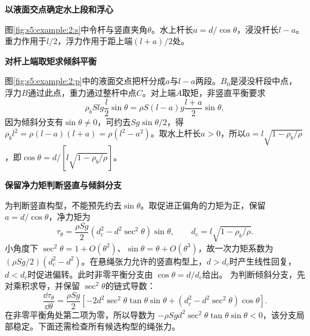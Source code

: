 \begin{solution}\textbf{以液面交点确定水上段和浮心}\par\nobreak
图\ref{fig:s5:example:2:s}中令杆与竖直夹角$\theta$。水上杆长$a=d/\cos\theta$，浸没杆长$l-a$。重力作用于$l/2$，浮力作用于距上端$(l+a)/2$处。



\par\medskip{}\noindent\textbf{对杆上端取矩求倾斜平衡}\par\nobreak
图\ref{fig:s5:example:2:p}中的液面交点把杆分成$a$与$l-a$两段。$B_0$是浸没杆段中点，浮力$B$通过此点，重力通过整杆中点$C$。对上端$A$取矩，非竖直平衡要求
\[
\rho_b Slg\frac l2\sin\theta
=\rho S(l-a)g\frac{l+a}{2}\sin\theta,
\]
因为倾斜分支有$\sin\theta\ne0$，可约去$Sg\sin\theta/2$，得$\rho_bl^2=\rho(l-a)(l+a)=\rho(l^2-a^2)$。取水上杆长$a>0$，所以$a=l\sqrt{1-\rho_b/\rho}$，即$\cos\theta=d/[l\sqrt{1-\rho_b/\rho}]$。

\par\medskip{}\noindent\textbf{保留净力矩判断竖直与倾斜分支}\par\nobreak
为判断竖直构型，不能预先约去$\sin\theta$。取促进正偏角的力矩为正，保留$a=d/\cos\theta$，净力矩为
\[
\tau_\theta=\frac{\rho Sg}{2}\left(d_c^2-d^2\sec^2\theta\right)\sin\theta,
\qquad d_c=l\sqrt{1-\rho_b/\rho}.
\]
小角度下 $\sec^2\theta=1+O(\theta^2)$、$\sin\theta=\theta+O(\theta^3)$，故一次力矩系数为 $(\rho Sg/2)(d_c^2-d^2)$。在悬绳张力允许的竖直构型上，$d>d_c$时产生线性回复，$d<d_c$时促进偏转。此时非零平衡分支由 $\cos\theta=d/d_c$给出。
为判断倾斜分支，先对乘积求导，并保留 $\sec^2\theta$的链式导数：
\[\frac{\dd\tau_\theta}{\dd\theta}
 =\frac{\rho Sg}{2}\left[-2d^2\sec^2\theta\tan\theta\sin\theta
 +(d_c^2-d^2\sec^2\theta)\cos\theta\right].\]
在非零平衡角处第二项为零，所以导数为 $-\rho Sg d^2\sec^2\theta\tan\theta\sin\theta<0$，该分支局部稳定。下面还需检查所有候选构型的绳张力。


\end{solution}
